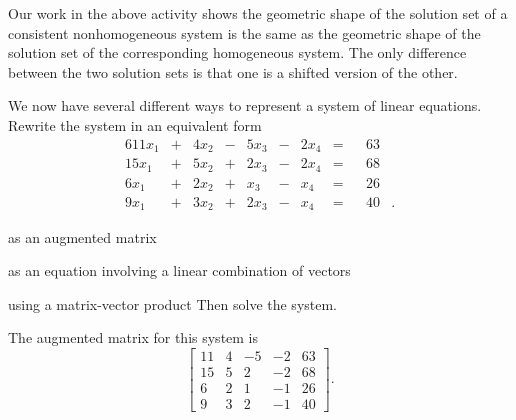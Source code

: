 Our work in the above activity shows the geometric shape of the solution set of a consistent nonhomogeneous system is the same as the geometric shape of the solution set of the corresponding homogeneous system. The only difference between the two solution sets is that one is a shifted version of the other.






\label{sec:mv_form_exam}

\ExampleIntro

\begin{example} We now have several different ways to represent a system of linear equations.  Rewrite the system in an equivalent form 
\begin{alignat*}{6}
{11}x_1	&{}+{} 	&{4}x_2 	&{}-{}	&{5}x_3 	&{}-{}	&{2}x_4	&= &{} &63&{} \\
{15}x_1 	&{}+{} 	&{5}x_2 	&{}+{}	&{2}x_3 	&{}-{}	&{2}x_4	&= &{} &68&{} \\
{6}x_1 	&{}+{} 	&{2}x_2 	&{}+{}	&{}x_3 	&{}-{}	&{}x_4	&= &{} &26&{} \\
{9}x_1 	&{}+{} 	&{3}x_2 	&{}+{}	&{2}x_3 	&{}-{}	&{}x_4	&= &{} &40&{.} 
\end{alignat*}
	\ba
	\item as an augmented matrix
	\item as an equation involving a linear combination of vectors
	\item using a matrix-vector product
	\ea
Then solve the system. \\

\ExampleSolution
\ba
\item The augmented matrix for this system is 
\[\left[ \begin{array}{ccrr|c} 11&4&-5&-2&63 \\ 15&5&2&-2&68 \\ 6&2&1&-1&26 \\ 9&3&2&-1&40 \end{array} \right].\]


\end{example}
